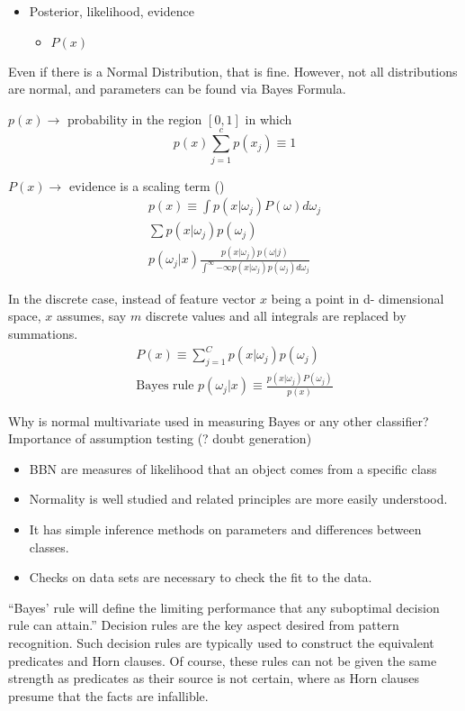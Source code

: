 \documentclass[11pt]{article}
\begin{document}
\begin{itemize}
	\item Posterior, likelihood, evidence
	\begin{itemize}
		\item $P(x)$	
	\end{itemize}
	
\end{itemize}

Even if there is a Normal Distribution, that is fine.  However, not all distributions are normal, and parameters can be found via Bayes Formula.  




$p(x) \to $   probability in the region $[ 0,1 ]$ in which 
\[
p(x) \sum^c _{j=1} p(x_j) \equiv 1
\]

$P(x) \to$ evidence is a scaling term (\cite[22]{duda-hart-stork}) 
\begin{eqnarray*}
	p(x) \equiv \int p(x | \omega _j) P(\omega) d \omega_j \\
	\sum p(x | \omega_j) p(\omega _j) \\
	p(\omega_j | x) \frac{p(x|\omega_j) p(\omega|j) }{\int^{\infty}{- \infty} p(x|\omega_j) p(\omega_j) d\omega_j} 
\end{eqnarray*}


In the discrete case, instead of feature vector $x$ being a point in d- dimensional space, $x$ assumes, say $m$ discrete values and all integrals are replaced by summations.  
\begin{eqnarray*}
	P(x) \equiv \sum ^C _{j=1} p(x|\omega_j) p(\omega _j) \\
	\textrm{Bayes rule } p(\omega_j |x) \equiv \frac{p(x|\omega_j) P(\omega_j)}{p(x)}
\end{eqnarray*}

Why is normal multivariate used in measuring Bayes or any other classifier?
Importance of assumption testing (? doubt generation)
\begin{itemize}
	\item BBN are measures of likelihood that an object comes from a specific class
	\item Normality is well studied and related principles are more easily understood.
	\item It has simple inference methods on parameters and differences between classes.
	\item Checks on data sets are necessary to check the fit to the data. 
\end{itemize}

``Bayes' rule will define the limiting performance that any suboptimal decision rule can attain.''  Decision rules are the key aspect desired from pattern recognition.  Such decision rules are typically used to construct the equivalent predicates and Horn clauses.   Of course, these rules can not be given the same strength as predicates as their source is not certain, where as Horn clauses presume that the facts are infallible. 
\end{document}
